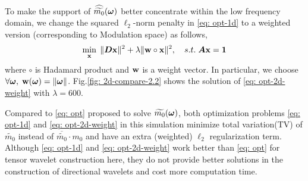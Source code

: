 To make the support of $\widehat{\widetilde{m_{0}}}(\boldsymbol{\omega})$ better concentrate within the low frequency domain, we change the squared $\ell_2$-norm penalty in \eqref{eq: opt-1d} to a weighted version (corresponding to Modulation space) as follows,
\begin{align}
\min_{\mathbf{x}}\; \Vert\boldsymbol{ D}\mathbf{x}\Vert^2 + \lambda\Vert \mathbf{w}\circ\mathbf{x}\Vert^2,\quad s.t. \; \boldsymbol{A}\mathbf{x} = \mathbf{1} \label{eq: opt-2d-weight}
\end{align} 
where $\circ$ is Hadamard product and $\mathbf{w}$ is a weight vector. In particular, we choose $\forall \boldsymbol{\omega}, \; \mathbf{w}(\boldsymbol{\omega}) = \Vert\boldsymbol{\omega}\Vert$. Fig.\ref{fig: 2d-compare-2.2} shows the solution of \eqref{eq: opt-2d-weight} with $\lambda=600$. %

Compared to \eqref{eq: opt} proposed to solve $\widetilde{m_{0}}(\boldsymbol{\omega})$, both optimization problems \eqref{eq: opt-1d} and \eqref{eq: opt-2d-weight} in this simulation minimize total variation(TV) of $\widetilde{m_0}$ instead of $\overline{\widetilde{m_0}}\cdot m_0$ and have an extra (weighted) $\ell_2$ regularization term. Although \eqref{eq: opt-1d} and \eqref{eq: opt-2d-weight} work better than \eqref{eq: opt} for tensor wavelet construction here, they do not provide better solutions in the construction of directional wavelets and cost more computation time.

\begin{comment}
\begin{minipage}{.9\textwidth}
\centering
\texttt{[image: 2d-m-compare-2-1-eps-converted-to.pdf]}\\
\texttt{[image: 2d-filter-compare-2-1-eps-converted-to.pdf]}
\captionof{figure}{result of \eqref{eq: opt-2d-weight} $\mhat{0}$ ($\lambda = 60$), target $\m{0}$ and their difference, Top: frequency domain, Bottom: time domain}
\label{fig: 2d-compare-2}
\end{minipage}
\end{comment}

